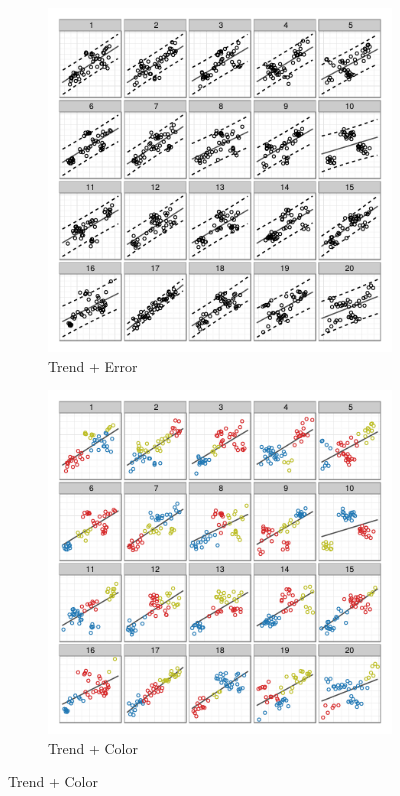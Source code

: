\documentclass[11pt]{isuthesis}\usepackage[]{graphicx}\usepackage[]{color}
\begin{document}
\begin{figure}[ht]
\begin{subfigure}[t]{0.28\linewidth}
\end{subfigure}
\begin{subfigure}[t]{0.28\linewidth}
  \caption{Trend + Error }
  \includegraphics[width=\linewidth]{fig-samplepics-8}
\end{subfigure}
\begin{subfigure}[t]{0.28\linewidth}
  \caption{Trend + Color}
  \includegraphics[width=\linewidth]{fig-samplepics-9}

\end{subfigure}
\end{figure}
\end{document}

